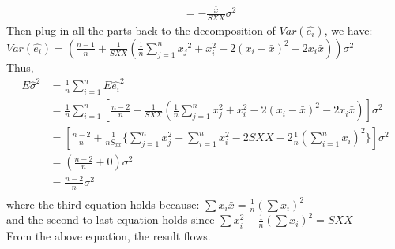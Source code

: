 \documentclass[12pt]{article}
\begin{document}
{\begin{align*}
                                 &=-\frac{\bar{x}}{SXX}\sigma^2
\end{align*}
Then plug in all the parts back to the decomposition of
$Var(\hat{e_i})$, we have:\\
$Var(\hat{e_i})=(\frac{n-1}{n}+\frac{1}{SXX}(\frac{1}{n}\displaystyle\sum_{j=1}^{n}{x_j}^2+x_i^2-2(x_i-\bar{x})^2-2x_i\bar{x}))\sigma^2$\\
\noindent Thus,\\
\begin{align*}
 E\hat{\sigma}^2&=\frac{1}{n}\displaystyle\sum_{i=1}^{n}E\hat{e_i}^2\\
                &=\frac{1}{n}\displaystyle\sum_{i=1}^{n}[\frac{n-2}{n}+\frac{1}{SXX}(\frac{1}{n}\displaystyle\sum_{j=1}^{n}x_j^2+x_i^2-2(x_i-\bar{x})^2-2x_i\bar{x})]\sigma^2\\
                &=[\frac{n-2}{n}+\frac{1}{nS_{xx}}\{\displaystyle\sum_{j=1}^{n}x_j^2+\displaystyle\sum_{i=1}^{n}x_i^2-2SXX-2\frac{1}{n}(\displaystyle\sum_{i=1}^{n}x_i)^2\}]\sigma^2\\
                &=(\frac{n-2}{n}+0)\sigma^2\\
                &=\frac{n-2}{n}\sigma^2\\
\end{align*}
where the third equation holds because:
$\sum{}{}x_i\bar{x}=\frac{1}{n}(\sum{}{} x_i)^2$\\
and the second to last equation holds since
$\sum{}{} x_i^2-\frac{1}{n}(\sum{}{} x_i)^2=SXX$\\
From the above equation, the result flows. \\
}
\end{document}
